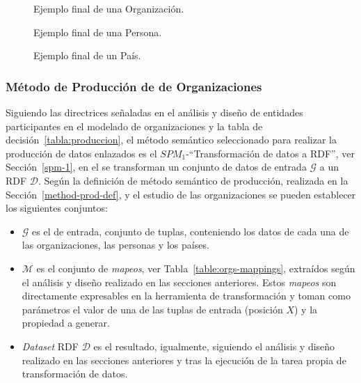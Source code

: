 \begin{figure}[!htp]

	\caption{Ejemplo final de una Organización.}
	\label{fig:orgs-example}
\end{figure}

\begin{figure}[!htp]
	
	\caption{Ejemplo final de una Persona.}
	\label{fig:people-example}
\end{figure}

\begin{figure}[!htp]

	\caption{Ejemplo final de un País.}
	\label{fig:countries-example}
\end{figure}


\subsubsection{Método de Producción de \linkeddata de Organizaciones}
Siguiendo las directrices señaladas en el análisis y diseño de entidades 
participantes en el modelado de organizaciones y la tabla de decisión~\ref{tabla:produccion}, el método semántico seleccionado 
para realizar la producción de datos enlazados es el $SPM_1$-``Transformación de datos a RDF'', ver Sección~\ref{spm-1}, en el 
se transforman un conjunto de datos de entrada $\mathcal{G}$ a un \dataset RDF $\mathcal{D}$. Según la definición de método 
semántico de producción, realizada en la Sección~\ref{method-prod-def}, y el estudio de las organizaciones se pueden 
establecer los siguientes conjuntos:

\begin{itemize}
 \item $\mathcal{G}$ es el \dataset de entrada, conjunto de tuplas, conteniendo los datos de cada una de las organizaciones, las personas y los países. 
 \item $\mathcal{M}$ es el conjunto de \textit{mapeos}, ver Tabla~\ref{table:orgs-mappings}, extraídos según el análisis y diseño realizado en las secciones anteriores. Estos 
\textit{mapeos} son directamente expresables en la herramienta de transformación y toman como parámetros el valor de una de las tuplas de entrada (posición $X$) y la propiedad a generar.
 \item \textit{Dataset} \gls{RDF} $\mathcal{D}$ es el \dataset resultado, igualmente, siguiendo el análisis y diseño realizado en las secciones anteriores y tras la ejecución 
de la tarea propia de transformación de datos.
\end{itemize}

